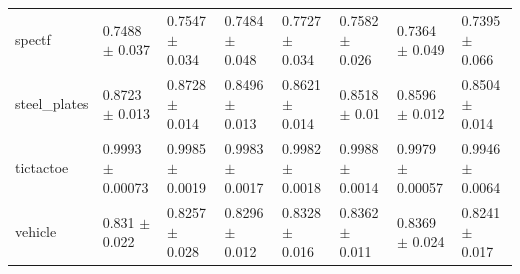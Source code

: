 \begin{tabular}{llllllll}
spectf & 0.7488 $\pm$ 0.037 & 0.7547 $\pm$ 0.034 & 0.7484 $\pm$ 0.048 & 0.7727 $\pm$ 0.034 & 0.7582 $\pm$ 0.026 & 0.7364 $\pm$ 0.049 & 0.7395 $\pm$ 0.066 \\
steel\_plates & 0.8723 $\pm$ 0.013 & 0.8728 $\pm$ 0.014 & 0.8496 $\pm$ 0.013 & 0.8621 $\pm$ 0.014 & 0.8518 $\pm$ 0.01 & 0.8596 $\pm$ 0.012 & 0.8504 $\pm$ 0.014 \\
tictactoe & 0.9993 $\pm$ 0.00073 & 0.9985 $\pm$ 0.0019 & 0.9983 $\pm$ 0.0017 & 0.9982 $\pm$ 0.0018 & 0.9988 $\pm$ 0.0014 & 0.9979 $\pm$ 0.00057 & 0.9946 $\pm$ 0.0064 \\
vehicle & 0.831 $\pm$ 0.022 & 0.8257 $\pm$ 0.028 & 0.8296 $\pm$ 0.012 & 0.8328 $\pm$ 0.016 & 0.8362 $\pm$ 0.011 & 0.8369 $\pm$ 0.024 & 0.8241 $\pm$ 0.017 \\
\bottomrule
\end{tabular}
